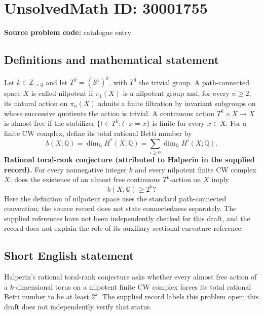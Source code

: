 \documentclass[11pt]{article}
\newcommand{\Z}{\mathbb{Z}}
\newcommand{\Q}{\mathbb{Q}}
\begin{document}
\section*{UnsolvedMath ID: 30001755}
\textbf{Source problem code:} catalogue entry
\subsection{Definitions and mathematical statement}
Let \(k\in\Z_{\geq 0}\) and let \(T^k=(S^1)^k\), with \(T^0\) the trivial group. A path-connected space \(X\) is called nilpotent if \(\pi_1(X)\) is a nilpotent group and, for every \(n\geq 2\), its natural action on \(\pi_n(X)\) admits a finite filtration by invariant subgroups on whose successive quotients the action is trivial. A continuous action \(T^k\times X\to X\) is almost free if the stabilizer \(\{t\in T^k:t\cdot x=x\}\) is finite for every \(x\in X\). For a finite CW complex, define its total rational Betti number by
\[
b(X;\Q)=\dim_{\Q}H^*(X;\Q)=\sum_{i\geq 0}\dim_{\Q}H^i(X;\Q).
\]
\textbf{Rational toral-rank conjecture (attributed to Halperin in the supplied record).} For every nonnegative integer \(k\) and every nilpotent finite CW complex \(X\), does the existence of an almost free continuous \(T^k\)-action on \(X\) imply
\[
b(X;\Q)\geq 2^k?
\]
Here the definition of nilpotent space uses the standard path-connected convention; the source record does not state connectedness separately. The supplied references have not been independently checked for this draft, and the record does not explain the role of its auxiliary sectional-curvature reference.
\subsection{Short English statement}
Halperin's rational toral-rank conjecture asks whether every almost free action of a \(k\)-dimensional torus on a nilpotent finite CW complex forces its total rational Betti number to be at least \(2^k\). The supplied record labels this problem open; this draft does not independently verify that status.
\end{document}
